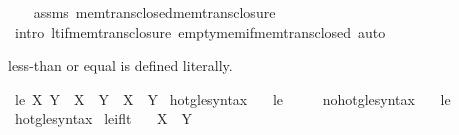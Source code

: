 \begin{isabellebody}
%
\isadelimproof
\ \ %
\endisadelimproof
%
\isatagproof
{}\isamarkupfalse%
\ assms\ mem{\isacharunderscore}{\kern0pt}trans{\isacharunderscore}{\kern0pt}closed{\isacharunderscore}{\kern0pt}mem{\isacharunderscore}{\kern0pt}trans{\isacharunderscore}{\kern0pt}closure\isanewline
\ \ \isamarkupfalse%
\ {\isacharparenleft}{\kern0pt}intro\ lt{\isacharunderscore}{\kern0pt}if{\isacharunderscore}{\kern0pt}mem{\isacharunderscore}{\kern0pt}trans{\isacharunderscore}{\kern0pt}closure\ empty{\isacharunderscore}{\kern0pt}mem{\isacharunderscore}{\kern0pt}if{\isacharunderscore}{\kern0pt}mem{\isacharunderscore}{\kern0pt}trans{\isacharunderscore}{\kern0pt}closed{\isacharparenright}{\kern0pt}\ auto%
\endisatagproof
{\isafoldproof}%
%
\isadelimproof
%
\endisadelimproof
%
\isadelimdocument
%
\endisadelimdocument
%
\isatagdocument
%
\isamarkuptrue%
%
\endisatagdocument
{\isafolddocument}%
%
\isadelimdocument
%
\endisadelimdocument
%
\begin{isamarkuptext}%
less-than or equal is defined literally.%
\end{isamarkuptext}\isamarkuptrue%
\isamarkupfalse%
\ {\isachardoublequoteopen}le\ X\ Y\ {\isasymequiv}\ X\ {\isacharless}{\kern0pt}\ Y\ {\isasymor}\ X\ {\isacharequal}{\kern0pt}\ Y{\isachardoublequoteclose}\isanewline
\isanewline
{}\isamarkupfalse%
\ hotg{\isacharunderscore}{\kern0pt}le{\isacharunderscore}{\kern0pt}syntax\ \ \isamarkupfalse%
\ le\ {\isacharparenleft}{\kern0pt}\ {\isachardoublequoteopen}{\isasymle}{\isachardoublequoteclose}\ {}{}{\isacharparenright}{\kern0pt}\ \isamarkupfalse%
\isanewline
{}\isamarkupfalse%
\ no{\isacharunderscore}{\kern0pt}hotg{\isacharunderscore}{\kern0pt}le{\isacharunderscore}{\kern0pt}syntax\ \ \isamarkupfalse%
\ le\ {\isacharparenleft}{\kern0pt}\ {\isachardoublequoteopen}{\isasymle}{\isachardoublequoteclose}\ {}{}{\isacharparenright}{\kern0pt}\ \isamarkupfalse%
\isanewline
{}\isamarkupfalse%
\ hotg{\isacharunderscore}{\kern0pt}le{\isacharunderscore}{\kern0pt}syntax\isanewline
\isanewline
{}\isamarkupfalse%
\ le{\isacharunderscore}{\kern0pt}if{\isacharunderscore}{\kern0pt}lt{\isacharcolon}{\kern0pt}\isanewline
\ \ \ {\isachardoublequoteopen}X\ {\isacharless}{\kern0pt}\ Y{\isachardoublequoteclose}\isanewline

\end{isabellebody}
